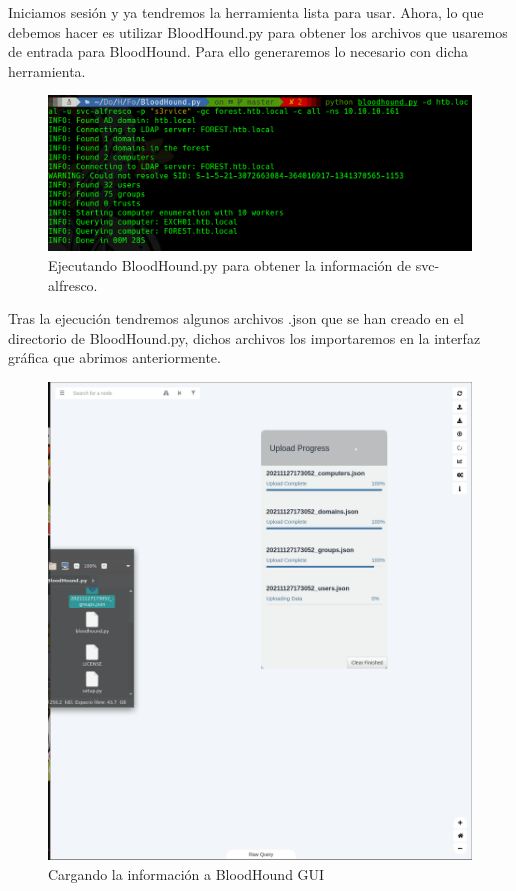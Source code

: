 \documentclass{article}
\begin{document}
Iniciamos sesión y ya tendremos la herramienta lista para usar. Ahora, lo que debemos hacer es utilizar BloodHound.py para obtener los archivos que usaremos de entrada para BloodHound. Para ello generaremos lo necesario con dicha herramienta.

\begin{figure}[H]
	\center
	\includegraphics[width=\textwidth]{images/forest/ejecutandobloodhound.py.png}
	\caption{Ejecutando BloodHound.py para obtener la información de svc-alfresco.}
\end{figure}

Tras la ejecución tendremos algunos archivos .json que se han creado en el directorio de BloodHound.py, dichos archivos los importaremos en la interfaz gráfica que abrimos anteriormente.

\begin{figure}[H]
	\center
	\includegraphics[width=\textwidth/2]{images/forest/CargandoLosJson.png}
	\caption{Cargando la información a BloodHound GUI}
\end{figure}
\end{document}
